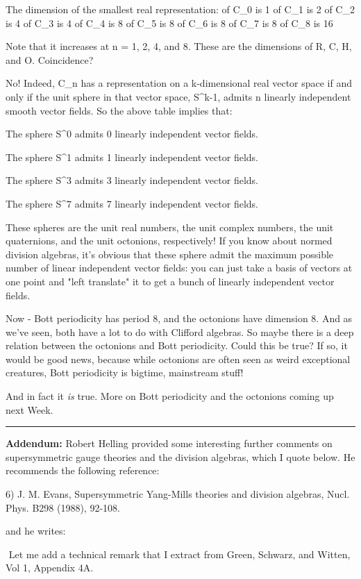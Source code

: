 The dimension of the smallest real representation:
of C_{0} is 1
of C_{1} is  2
of C_{2} is  4
of C_{3} is  4
of C_{4} is  8
of C_{5} is  8
of C_{6} is 8
of C_{7} is  8
of C_{8} is  16

Note that it increases at n = 1, 2, 4, and 8.  These are the dimensions
of R, C, H, and O.  Coincidence?  

No!  Indeed, C_{n} has a representation on a k-dimensional real
vector space if and only if the unit sphere in that vector space,
S^{k-1}, admits n linearly independent smooth vector fields.  So the
above table implies that:

The sphere S^{0} admits 0 linearly independent vector fields.  

The sphere S^{1} admits 1 linearly independent vector fields.  

The sphere S^{3} admits 3 linearly independent vector fields.  

The sphere S^{7} admits 7 linearly independent vector fields.  

These spheres are the unit real numbers, the unit complex numbers, the
unit quaternions, and the unit octonions, respectively!  If you know
about normed division algebras, it's obvious that these sphere admit the
maximum possible number of linear independent vector fields: you can
just take a basis of vectors at one point and "left translate" it to get
a bunch of linearly independent vector fields.  

Now - Bott periodicity has period 8, and the octonions have dimension
8.  And as we've seen, both have a lot to do with Clifford algebras.  So
maybe there is a deep relation between the octonions and Bott
periodicity.  Could this be true?  If so, it would be good news, because
while octonions are often seen as weird exceptional creatures, Bott
periodicity is bigtime, mainstream stuff!

And in fact it \emph{is} true.  More on Bott periodicity and the octonions
coming up next Week.

\par\noindent\rule{\textwidth}{0.4pt}
\textbf{Addendum:}  Robert Helling provided some interesting further comments
on supersymmetric gauge theories and the division algebras, which 
I quote below.  He recommends the following reference:

6) J. M. Evans, Supersymmetric Yang-Mills theories and division algebras, Nucl.
Phys. B298 (1988), 92-108.

and he writes:

$$
Let me add a technical remark that I extract from Green, Schwarz, 
and Witten, Vol 1, Appendix 4A.


